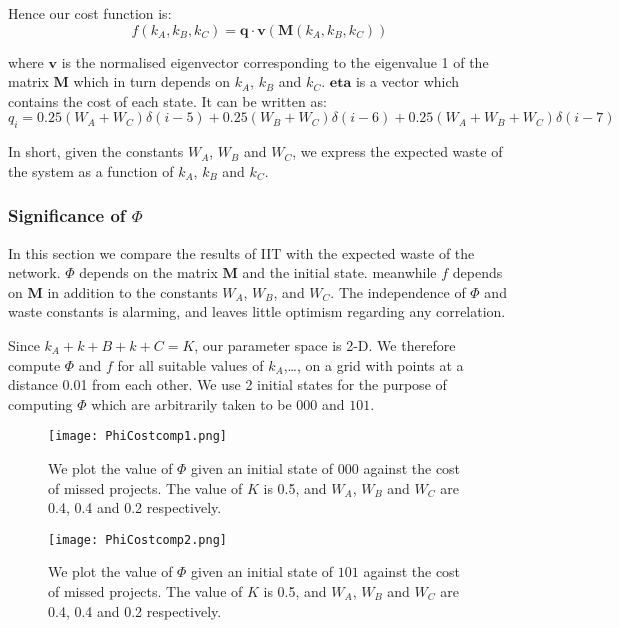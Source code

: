 Hence our cost function is:
\begin{equation}
\label{eq:simple_model_cost_function}
f(k_A, k_B, k_C) = \mathbf{q} \cdot \mathbf{v}(\mathbf{M}(k_A, k_B, k_C))
\end{equation}

where $\mathbf{v}$ is the normalised eigenvector corresponding to the eigenvalue 1 of the matrix $\mathbf{M}$ which in turn depends on $k_A$, $k_B$ and $k_C$. $\mathbf{eta}$ is a vector which contains the cost of each state. It can be written as: 
\begin{equation}
q_i = 0.25(W_A+W_C)\delta(i-5) + 0.25(W_B+W_C)\delta(i-6) + 0.25(W_A+W_B+W_C)\delta(i-7)
\end{equation}

In short, given the constants $W_A$, $W_B$ and $W_C$, we express the expected waste of the system as a function of $k_A$, $k_B$ and $k_C$. 

\subsubsection{Significance of $\Phi$}

In this section we compare the results of IIT with the expected waste of the network. $\Phi$ depends on the matrix $\mathbf{M}$ and the initial state. meanwhile $f$ depends on $\mathbf{M}$ in addition to the constants $W_A$, $W_B$, and $W_C$. The independence of $\Phi$ and waste constants is alarming, and leaves little optimism regarding any correlation. 

Since $k_A + k+B+ k+C = K$, our parameter space is 2-D. We therefore compute $\Phi$ and $f$ for all suitable values of $k_A$,\ldots, on a grid with points at a distance 0.01 from each other. We use 2 initial states for the purpose of computing $\Phi$ which are arbitrarily taken to be $000$ and $101$.

\begin{figure}[!ht]
	\centering
	\texttt{[image: PhiCostcomp1.png]}
	\caption{We plot the value of $\Phi$ given an initial state of $000$  against the cost of missed projects. The value of $K$ is 0.5, and $W_A$, $W_B$ and $W_C$ are 0.4, 0.4 and 0.2 respectively. }
	\label{fig:PhiCostcomp1}
\end{figure}

\begin{figure}[!ht]
	\centering
	\texttt{[image: PhiCostcomp2.png]}
	\caption{We plot the value of $\Phi$ given an initial state of $101$ against the cost of missed projects. The value of $K$ is 0.5, and $W_A$, $W_B$ and $W_C$ are 0.4, 0.4 and 0.2 respectively. }
	\label{fig:PhiCostcomp2}
\end{figure}

